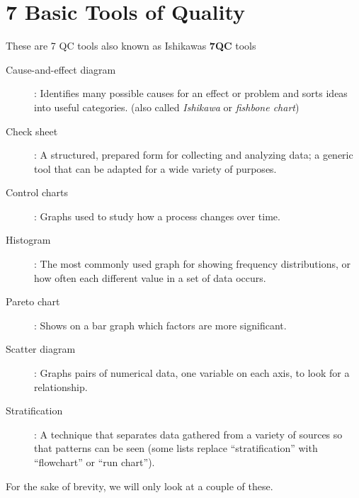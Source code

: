 \documentclass[]{report}
\begin{document}
\section{7 Basic Tools of Quality }
{\large
	These are 7 QC tools also known as Ishikawas \textbf{7QC} tools
	\begin{description}
		\item[Cause-and-effect diagram]: Identifies many possible causes for an effect or problem and sorts ideas into useful categories.
		(also called \textit{Ishikawa} or\textit{ fishbone chart})
		
		\item[Check sheet]: A structured, prepared form for collecting and analyzing data; a generic tool that can be adapted for a wide variety of purposes.
		
		\item[Control charts]: Graphs used to study how a process changes over time.
		
		\item[Histogram]: The most commonly used graph for showing frequency distributions, or how often each different value in a set of data occurs.
		
		\item[Pareto chart]: Shows on a bar graph which factors are more significant.
		
		\item[Scatter diagram]: Graphs pairs of numerical data, one variable on each axis, to look for a relationship.
		
		\item[Stratification]: A technique that separates data gathered from a variety of sources so that patterns can be seen (some lists replace “stratification” with “flowchart” or “run chart”).
	\end{description}
	For the sake of brevity, we will only look at a couple of these.
}

\newpage
\end{document}
